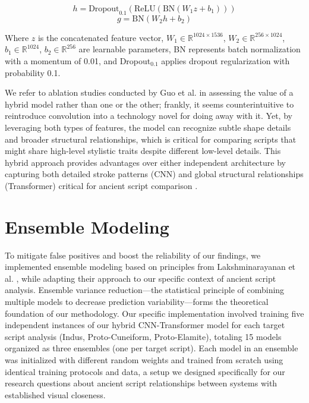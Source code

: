 \documentclass[11pt,a4paper,oneside]{report}
\begin{document}
\begin{equation}
h = \text{Dropout}_{0.1}(\text{ReLU}(\text{BN}(W_1 z + b_1)))
\end{equation}
\begin{equation}
g = \text{BN}(W_2 h + b_2)
\end{equation}

Where $z$ is the concatenated feature vector, $W_1 \in \mathbb{R}^{1024 \times 1536}$, $W_2 \in \mathbb{R}^{256 \times 1024}$, $b_1 \in \mathbb{R}^{1024}$, $b_2 \in \mathbb{R}^{256}$ are learnable parameters, BN represents batch normalization with a momentum of 0.01, and Dropout$_{0.1}$ applies dropout regularization with probability 0.1.

We refer to ablation studies conducted by Guo et al. \cite{guo_cmt_2022} in assessing the value of a hybrid model rather than one or the other; frankly, it seems counterintuitive to reintroduce convolution into a technology novel for doing away with it. Yet, by leveraging both types of features, the model can recognize subtle shape details and broader structural relationships, which is critical for comparing scripts that might share high-level stylistic traits despite different low-level details. This hybrid approach provides advantages over either independent architecture by capturing both detailed stroke patterns (CNN) and global structural relationships (Transformer) critical for ancient script comparison \cite{guo_cmt_2022, bennour_heritagescript_2024, abimouloud_vision_2024}.

\section{Ensemble Modeling}
\noindent\hspace{1cm}
To mitigate false positives and boost the reliability of our findings, we implemented ensemble modeling based on principles from Lakshminarayanan et al. \cite{lakshminarayanan_simple_2016}, while adapting their approach to our specific context of ancient script analysis. Ensemble variance reduction—the statistical principle of combining multiple models to decrease prediction variability—forms the theoretical foundation of our methodology. Our specific implementation involved training five independent instances of our hybrid CNN-Transformer model for each target script analysis (Indus, Proto-Cuneiform, Proto-Elamite), totaling 15 models organized as three ensembles (one per target script). Each model in an ensemble was initialized with different random weights and trained from scratch using identical training protocols and data, a setup we designed specifically for our research questions about ancient script relationships between systems with established visual closeness\cite{daggumati_data_2018}.
\end{document}
